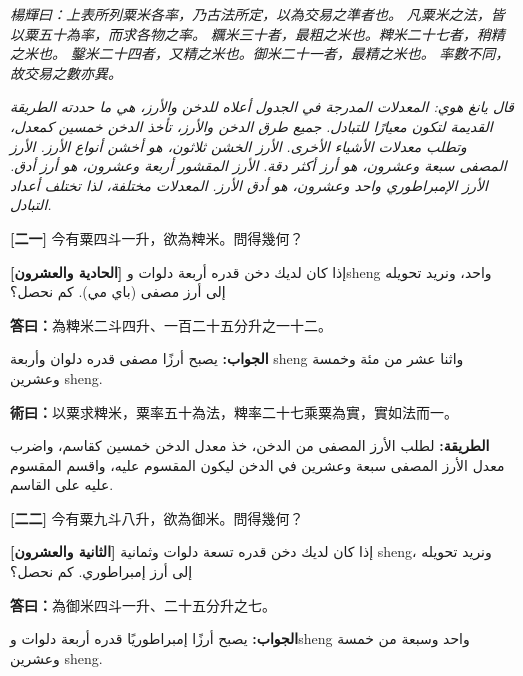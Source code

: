 \documentclass[11pt,a4paper]{article}
\newcommand{\bilingualrow}[2]{%
\noindent\begin{minipage}[t]{0.48\textwidth}#1\end{minipage}\hfill\begin{minipage}[t]{0.48\textwidth}\arabicfont\beginR #2\endR\end{minipage}\par\vspace{0.5cm}}
\begin{document}
\bilingualrow{
\textcolor{commentarycolor}{\small\textit{楊輝曰：上表所列粟米各率，乃古法所定，以為交易之準者也。}}
\textcolor{commentarycolor}{\small\textit{凡粟米之法，皆以粟五十為率，而求各物之率。}}
\textcolor{commentarycolor}{\small\textit{糲米三十者，最粗之米也。粺米二十七者，稍精之米也。}}
\textcolor{commentarycolor}{\small\textit{鑿米二十四者，又精之米也。御米二十一者，最精之米也。}}
\textcolor{commentarycolor}{\small\textit{率數不同，故交易之數亦異。}}
}{
\textcolor{commentarycolor}{\small\textit{قال يانغ هوي: المعدلات المدرجة في الجدول أعلاه للدخن والأرز، هي ما حددته الطريقة القديمة لتكون معيارًا للتبادل.}}
\textcolor{commentarycolor}{\small\textit{جميع طرق الدخن والأرز، تأخذ الدخن خمسين كمعدل، وتطلب معدلات الأشياء الأخرى.}}
\textcolor{commentarycolor}{\small\textit{الأرز الخشن ثلاثون، هو أخشن أنواع الأرز. الأرز المصفى سبعة وعشرون، هو أرز أكثر دقة.}}
\textcolor{commentarycolor}{\small\textit{الأرز المقشور أربعة وعشرون، هو أرز أدق. الأرز الإمبراطوري واحد وعشرون، هو أدق الأرز.}}
\textcolor{commentarycolor}{\small\textit{المعدلات مختلفة، لذا تختلف أعداد التبادل.}}
}

\vspace{1em}

\bilingualrow{
\textbf{[二一]} 今有粟四斗一升，欲為粺米。問得幾何？
}{
\textbf{[الحادية والعشرون]} إذا كان لديك دخن قدره أربعة دلوات وsheng واحد، ونريد تحويله إلى أرز مصفى (باي مي). كم نحصل؟
}

\bilingualrow{
\textcolor{answercolor}{\textbf{答曰：}}為粺米二斗四升、一百二十五分升之一十二。
}{
\textcolor{answercolor}{\textbf{الجواب:}} يصبح أرزًا مصفى قدره دلوان وأربعة sheng واثنا عشر من مئة وخمسة وعشرين sheng.
}

\vspace{0.5em}

\bilingualrow{
\textcolor{methodcolor}{\textbf{術曰：}}以粟求粺米，粟率五十為法，粺率二十七乘粟為實，實如法而一。
}{
\textcolor{methodcolor}{\textbf{الطريقة:}} لطلب الأرز المصفى من الدخن، خذ معدل الدخن خمسين كقاسم، واضرب معدل الأرز المصفى سبعة وعشرين في الدخن ليكون المقسوم عليه، واقسم المقسوم عليه على القاسم.
}

\vspace{1em}

\bilingualrow{
\textbf{[二二]} 今有粟九斗八升，欲為御米。問得幾何？
}{
\textbf{[الثانية والعشرون]} إذا كان لديك دخن قدره تسعة دلوات وثمانية sheng، ونريد تحويله إلى أرز إمبراطوري. كم نحصل؟
}

\bilingualrow{
\textcolor{answercolor}{\textbf{答曰：}}為御米四斗一升、二十五分升之七。
}{
\textcolor{answercolor}{\textbf{الجواب:}} يصبح أرزًا إمبراطوريًا قدره أربعة دلوات وsheng واحد وسبعة من خمسة وعشرين sheng.
}
\end{document}
